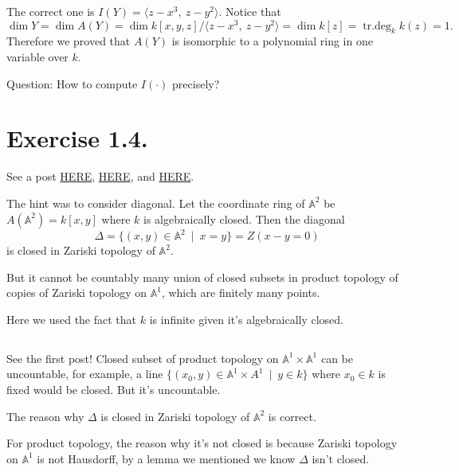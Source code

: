 The correct one is $I(Y)=\langle z-x^3,~ z-y^2\rangle$.
Notice that \[\operatorname{dim}Y=\operatorname{dim}A(Y)=\operatorname{dim}k[x,y,z]/\langle z-x^3,~ z-y^2\rangle=\operatorname{dim}k[z]=\operatorname{tr.deg}_k k(z)=1.\]
Therefore we proved that $A(Y)$ is isomorphic to a polynomial ring in one variable over $k$.

Question: How to compute $I(\cdot)$ precisely?

\section{Exercise 1.4.}

See a post \href{https://math.stackexchange.com/questions/128102/why-is-the-zariski-topology-on-bbb-a2-not-the-product-topology-on-bbb-a1}{HERE}, \href{https://math.stackexchange.com/questions/2119539/proving-that-the-zariski-topology-in-mathbba2-is-not-the-product-topology}{HERE},
and \href{https://math.stackexchange.com/questions/1607060/show-that-the-zariski-topology-on-a2-is-not-the-product-topology-on-a1-tim}{HERE}.

The hint was to consider diagonal. Let the coordinate ring of $\mathbb A^2$ be $A(\mathbb A^2)=k[x,y]$ where $k$ is algebraically closed. 
Then the diagonal \[\Delta =\{(x,y)\in\mathbb A^2 ~\mid~ x=y\}= Z(x-y=0)\] is closed in Zariski topology of $\mathbb A^2$.

But it cannot be countably many union of closed subsets in product topology of copies of Zariski topology on $\mathbb A^1$, which are finitely many points. 

Here we used the fact that $k$ is infinite given it's algebraically closed.

\subsection{}

See the first post!
Closed subset of product topology on $\mathbb A^1\times \mathbb A^1$ can be uncountable, for example, a line $\{(x_0,y)\in\mathbb A^1\times A^1 ~\mid~ y\in k\}$ where $x_0\in k$ is fixed would be closed. But it's uncountable. 

The reason why $\Delta$ is closed in Zariski topology of $\mathbb A^2$ is correct. 

For product topology, the reason why it's not closed is because Zariski topology on $\mathbb A^1$ is not Hausdorff, by a lemma we mentioned we know $\Delta$ isn't closed. 

